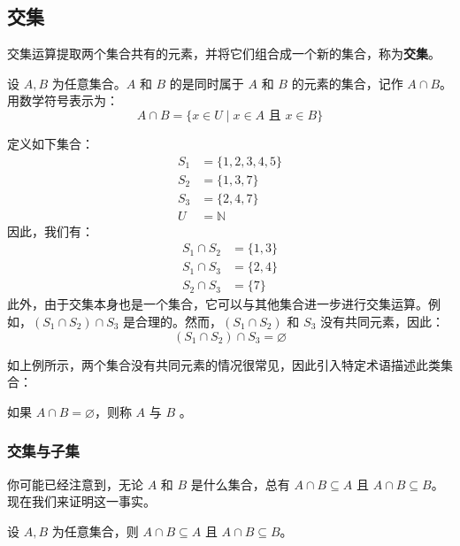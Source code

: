 \subsection{交集}

交集运算提取两个集合共有的元素，并将它们组合成一个新的集合，称为\textbf{交集}。

\begin{definition}
    设 $A, B$ 为任意集合。$A$ 和 $B$ 的是同时属于 $A$ 和 $B$ 的元素的集合，记作 $A \cap B$。用数学符号表示为：
    \[A \cap B = \{x \in U \mid x \in A \text{\ 且\ } x \in B\}\]
\end{definition}

\begin{example}\label{ex:example3.5.1}
    定义如下集合：
    \begin{align*}
        S_1 &= \{1, 2, 3, 4, 5\}\\
        S_2 &= \{1, 3, 7\}\\
        S_3 &= \{2, 4, 7\}\\
        U &= \mathbb{N}
    \end{align*}
    因此，我们有：
    \begin{align*}
        S_1 \cap S_2 &= \{1, 3\} \\
        S_1 \cap S_3 &= \{2, 4\} \\
        S_2 \cap S_3 &= \{7\}
    \end{align*}
    此外，由于交集本身也是一个集合，它可以与其他集合进一步进行交集运算。例如，$(S_1 \cap S_2) \cap S_3$ 是合理的。然而，$(S_1 \cap S_2)$ 和 $S_3$ 没有共同元素，因此：
    \[(S_1 \cap S_2) \cap S_3 = \varnothing\]
\end{example}

如上例所示，两个集合没有共同元素的情况很常见，因此引入特定术语描述此类集合：

\begin{definition}
    如果 $A \cap B = \varnothing$，则称 $A$ 与 $B$ 。
\end{definition}

\subsubsection*{交集与子集}

你可能已经注意到，无论 $A$ 和 $B$ 是什么集合，总有 $A \cap B \subseteq A$ 且 $A \cap B \subseteq B$。现在我们来证明这一事实。

\begin{proposition}
    设 $A, B$ 为任意集合，则 $A \cap B \subseteq A$ 且 $A \cap B \subseteq B$。
\end{proposition}

